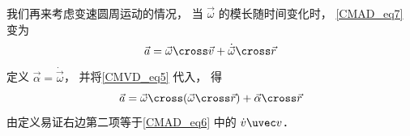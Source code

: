 我们再来考虑变速圆周运动的情况， 当 $\vec\omega$ 的模长随时间变化时， \autoref{CMAD_eq7} 变为
\begin{equation}
\vec a = \vec\omega \cross \vec v + \dot{\vec\omega} \cross \vec r 
\end{equation}
定义 $\vec\alpha = \dot{\vec\omega}$， 并将\autoref{CMVD_eq5} 代入， 得
\begin{equation}
\vec a =  \vec\omega \cross (\vec\omega \cross \vec r) + \vec\alpha\cross\vec r
\end{equation}
由定义易证右边第二项等于\autoref{CMAD_eq6} 中的 $\dot v\uvec v$．




